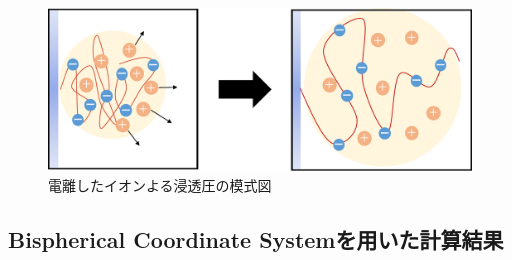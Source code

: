 \documentclass[10.5pt,a4j]{jarticle}
\begin{document}
\begin{figure}[h]
\centering
\includegraphics[width=120mm]{Fig/Fig.10/shintoatu.pdf}
\caption{電離したイオンよる浸透圧の模式図}
\label{Fig3-1-3}
\end{figure}
\newpage
\subsection{Bispherical Coordinate Systemを用いた計算結果}
\end{document}
